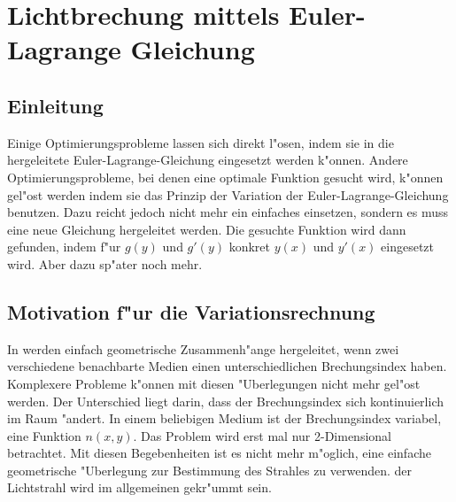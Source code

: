 \section{Lichtbrechung mittels Euler-Lagrange Gleichung}
\subsection{Einleitung}
Einige Optimierungsprobleme lassen sich direkt l"osen, indem sie in die
hergeleitete Euler-Lagrange-Gleichung eingesetzt werden k"onnen. Andere
Optimierungsprobleme, bei denen eine optimale Funktion gesucht
wird, k"onnen gel"ost werden indem sie das Prinzip der Variation der
Euler-Lagrange-Gleichung benutzen. Dazu reicht jedoch nicht mehr ein
einfaches einsetzen, sondern es muss eine neue Gleichung hergeleitet
werden. Die gesuchte Funktion wird dann gefunden, indem f"ur $g(y)$ und
$g'(y)$ konkret $y(x)$ und $y'(x)$ eingesetzt wird. Aber dazu sp"ater
noch mehr.

\subsection{Motivation f"ur die Variationsrechnung}
In  werden einfach geometrische Zusammenh"ange
hergeleitet, wenn zwei verschiedene benachbarte Medien einen
unterschiedlichen Brechungsindex haben. Komplexere Probleme k"onnen mit
diesen "Uberlegungen nicht mehr gel"ost werden. Der Unterschied liegt
darin, dass der Brechungsindex sich kontinuierlich im Raum "andert. In
einem  beliebigen  Medium  ist  der Brechungsindex variabel, eine
Funktion $n(x,y)$. Das  Problem wird erst mal nur 2-Dimensional
betrachtet. Mit diesen Begebenheiten ist es nicht mehr m"oglich, eine
einfache geometrische "Uberlegung  zur  Bestimmung  des  Strahles  zu
verwenden. der Lichtstrahl wird im allgemeinen gekr"ummt sein.

